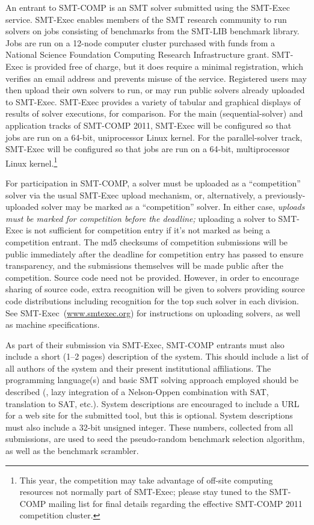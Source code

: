 \documentclass[12pt]{article}
\begin{document}
An entrant to SMT-COMP is an SMT solver
submitted using the SMT-Exec service.  SMT-Exec enables members of the
SMT research community to run solvers on jobs consisting of benchmarks
from the SMT-LIB benchmark library.  Jobs are run on a 12-node computer
cluster purchased with funds from a National Science Foundation
Computing Research Infrastructure grant.  SMT-Exec is provided free of
charge, but it does require a minimal registration, which verifies an
email address and prevents misuse of the service.  Registered users
may then upload their own solvers to run, or may run public solvers
already uploaded to SMT-Exec.  SMT-Exec provides a variety of tabular
and graphical displays of results of solver executions, for
comparison. For the main (sequential-solver)
and application tracks 
of SMT-COMP 2011, SMT-Exec will be configured so that jobs are run on a 64-bit,
uniprocessor Linux kernel.  For the parallel-solver track, SMT-Exec
will be configured so that jobs are run on a 64-bit, multiprocessor
Linux kernel.\footnote{This year, the competition may take
  advantage of off-site computing resources not normally part of
  SMT-Exec; please stay tuned to the SMT-COMP mailing list for final
  details regarding the effective SMT-COMP 2011 competition cluster.}

For participation in SMT-COMP, a solver must be
uploaded as a ``competition'' solver via the usual SMT-Exec upload
mechanism, or, alternatively, a previously-uploaded solver may be
marked as a ``competition'' solver.  In either case, \emph{uploads
must be marked for competition before the deadline;} uploading a solver
to SMT-Exec is not sufficient for competition entry if it's not marked
as being a competition entrant.  The md5 checksums of competition
submissions will be public immediately after the deadline for competition
entry has passed to ensure transparency, and the submissions themselves
will be made public after the competition.  Source code need not be
provided.  However, in order to encourage sharing of source code, extra
recognition will be given to solvers providing source code distributions
including recognition for the top such solver in each division.  See
SMT-Exec~(\url{www.smtexec.org}) for instructions on uploading solvers, as well
as machine specifications.

As part of their submission via SMT-Exec,
SMT-COMP entrants must also include a short (1--2 pages) description of
the system.  This should include a list of all authors of the system
and their present institutional affiliations.  The programming
language(s) and basic SMT solving approach employed should be
described (\eg, lazy integration of a Nelson-Oppen combination with
SAT, translation to SAT, etc.).  System descriptions are encouraged to
include a URL for a web site for the submitted tool, but this is
optional.  System descriptions must also include a 32-bit unsigned
integer.  These numbers, collected from all submissions, are used
to seed the pseudo-random benchmark selection algorithm, as well
as the benchmark scrambler.
\end{document}
